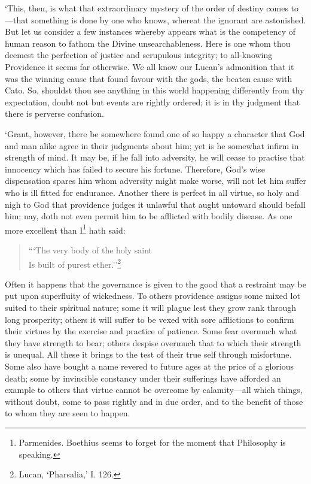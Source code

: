 \documentclass[12pt]{book}
\begin{document}
`This, then, is what that extraordinary mystery of the order of destiny
comes to---that something is done by one who knows, whereat the ignorant
are astonished. But let us consider a few instances whereby appears what
is the competency of human reason to fathom the Divine unsearchableness.
Here is one whom thou deemest the perfection of justice and scrupulous
integrity; to all-knowing Providence it seems far otherwise. We all know
our Lucan's admonition that it was the winning cause that found favour
with the gods, the beaten cause with Cato. So, shouldst thou see
anything in this world happening differently from thy expectation, doubt
not but events are rightly ordered; it is in thy judgment that there is
perverse confusion.

`Grant, however, there be somewhere found one of so happy a character
that God and man alike agree in their judgments about him; yet is he
somewhat infirm in strength of mind. It may be, if he fall into
adversity, he will cease to practise that innocency which has failed to
secure his fortune. Therefore, God's wise dispensation spares him whom
adversity might make worse, will not let him suffer who is ill fitted
for endurance. Another there is perfect in all virtue, so holy and nigh
to God that providence judges it unlawful that aught untoward should
befall him; nay, doth not even permit him to be afflicted with bodily
disease. As one more excellent than I\footnote{Parmenides. Boethius seems to forget for the moment that Philosophy is speaking.}
hath said:

\begin{quote}
    ```The very body of the holy saint \\
    Is built of purest ether.''\footnote{Lucan, `Pharsalia,’ I. 126.}
\end{quote}

Often it happens that the governance is given to the good that a
restraint may be put upon superfluity of wickedness. To others
providence assigns some mixed lot suited to their spiritual nature; some
it will plague lest they grow rank through long prosperity; others it
will suffer to be vexed with sore afflictions to confirm their virtues
by the exercise and practice of patience. Some fear overmuch what they
have strength to bear; others despise overmuch that to which their
strength is unequal. All these it brings to the test of their true self
through misfortune. Some also have bought a name revered to future ages
at the price of a glorious death; some by invincible constancy under
their sufferings have afforded an example to others that virtue cannot
be overcome by calamity---all which things, without doubt, come to pass
rightly and in due order, and to the benefit of those to whom they are
seen to happen.
\end{document}
